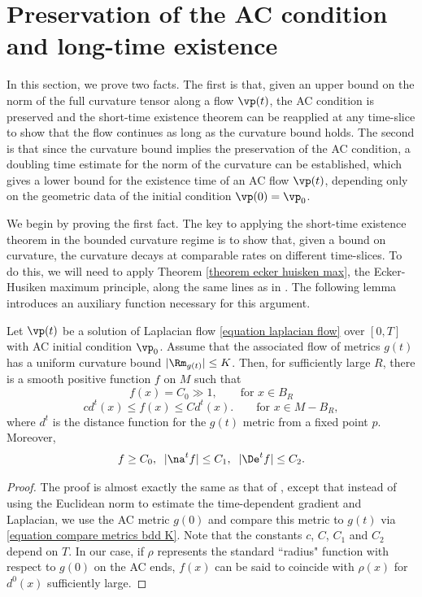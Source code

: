 \documentclass[hidelinks, 12pt, oneside, reqno]{amsart}
\begin{document}
\section{Preservation of the AC condition and long-time existence}\label{section long time behavior}

In this section, we prove two facts. The first is that, given an upper bound on the norm of the full curvature tensor along a flow $\vp(t)$, the AC condition is preserved and the short-time existence theorem can be reapplied at any time-slice to show that the flow continues as long as the curvature bound holds. The second is that since the curvature bound implies the preservation of the AC condition, a doubling time estimate for the norm of the curvature can be established, which gives a lower bound for the existence time of an AC flow $\vp(t)$, depending only on the geometric data of the initial condition $\vp(0) = \vp_0$.

We begin by proving the first fact. The key to applying the short-time existence theorem in the bounded curvature regime is to show that, given a bound on curvature, the curvature decays at comparable rates on different time-slices. To do this, we will need to apply Theorem \ref{theorem ecker huisken max}, the Ecker-Husiken maximum principle, along the same lines as in \cite{DaiMa}. The following lemma introduces an auxiliary function necessary for this argument. 

\begin{lem}\cite[Lemma 6]{DaiMa}\label{lemma aux function}
Let $\vp(t)$ be a solution of Laplacian flow \eqref{equation laplacian flow} over $[0,T]$ with AC initial condition $\vp_0$. Assume that the associated flow of metrics $g(t)$ has a uniform curvature bound $|\Rm_{g(t)}|\le K$. Then, for sufficiently large $R$, there is a smooth positive function $f$ on $M$ such that
\[
f(x) = C_0 \gg 1, \qquad \text{for } x \in B_R
\]
\[
cd^t(x) \le f(x) \le C d^t(x). \qquad \text{for } x \in M - B_R,
\]
where $d^t$ is the distance function for the $g(t)$ metric from a fixed point $p$. Moreover, 
\[
f \ge C_0, \; \; |\na^t f| \le C_1, \;\; |\De^t f| \le C_2.
\]
\end{lem}

\begin{proof}
    The proof is almost exactly the same as that of \cite[Lemma 6]{DaiMa}, except that instead of using the Euclidean norm to estimate the time-dependent gradient and Laplacian, we use the AC metric $g(0)$ and compare this metric to $g(t)$ via \eqref{equation compare metrics bdd K}.  Note that the constants $c$, $C$, $C_1$ and $C_2$ depend on $T$. In our case, if $\rho$ represents the standard ``radius" function with respect to $g(0)$ on the AC ends, $f(x)$ can be said to coincide with $\rho(x)$ for $d^0(x)$ sufficiently large.
\end{proof}
\end{document}
